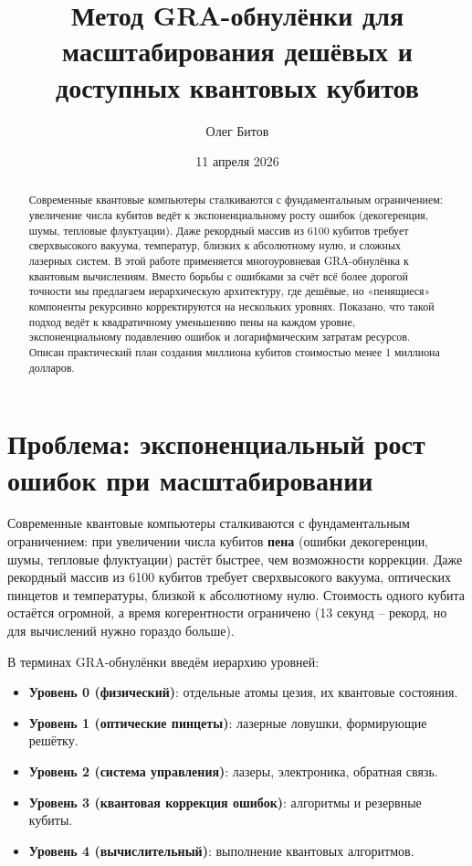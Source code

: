 \documentclass[12pt,a4paper]{article}
\title{Метод GRA-обнулёнки для масштабирования дешёвых и доступных квантовых кубитов}
\author{Олег Битов}
\date{11 апреля 2026}
\begin{document}
\maketitle

\begin{abstract}
Современные квантовые компьютеры сталкиваются с фундаментальным ограничением: увеличение числа кубитов ведёт к экспоненциальному росту ошибок (декогеренция, шумы, тепловые флуктуации). Даже рекордный массив из 6100 кубитов требует сверхвысокого вакуума, температур, близких к абсолютному нулю, и сложных лазерных систем. В этой работе применяется многоуровневая GRA-обнулёнка к квантовым вычислениям. Вместо борьбы с ошибками за счёт всё более дорогой точности мы предлагаем иерархическую архитектуру, где дешёвые, но «пенящиеся» компоненты рекурсивно корректируются на нескольких уровнях. Показано, что такой подход ведёт к квадратичному уменьшению пены на каждом уровне, экспоненциальному подавлению ошибок и логарифмическим затратам ресурсов. Описан практический план создания миллиона кубитов стоимостью менее 1 миллиона долларов.
\end{abstract}

\section{Проблема: экспоненциальный рост ошибок при масштабировании}

Современные квантовые компьютеры сталкиваются с фундаментальным ограничением: при увеличении числа кубитов \textbf{пена} (ошибки декогеренции, шумы, тепловые флуктуации) растёт быстрее, чем возможности коррекции. Даже рекордный массив из 6100 кубитов требует сверхвысокого вакуума, оптических пинцетов и температуры, близкой к абсолютному нулю. Стоимость одного кубита остаётся огромной, а время когерентности ограничено (13 секунд – рекорд, но для вычислений нужно гораздо больше).

В терминах GRA-обнулёнки введём иерархию уровней:

\begin{itemize}
    \item \textbf{Уровень 0 (физический)}: отдельные атомы цезия, их квантовые состояния.
    \item \textbf{Уровень 1 (оптические пинцеты)}: лазерные ловушки, формирующие решётку.
    \item \textbf{Уровень 2 (система управления)}: лазеры, электроника, обратная связь.
    \item \textbf{Уровень 3 (квантовая коррекция ошибок)}: алгоритмы и резервные кубиты.
    \item \textbf{Уровень 4 (вычислительный)}: выполнение квантовых алгоритмов.
\end{itemize}
\end{document}
